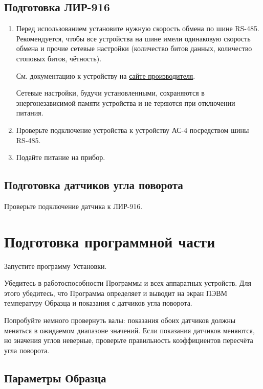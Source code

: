 \documentclass[12pt, a4paper, twocolumn]{report}
\begin{document}
\subsection{Подготовка ЛИР-916}

\begin{enumerate}

\item Перед использованием установите нужную скорость обмена по шине RS-485. Рекомендуется, чтобы все устройства на шине имели одинаковую скорость обмена и прочие сетевые настройки (количество битов данных, количество стоповых битов, чётность).

См. документацию к устройству на \href{http://www.skbis.ru/index.php?p=3&c=8&d=56}{сайте производителя}.

Сетевые настройки, будучи установленными, сохраняются в энергонезависимой памяти устройства и не теряются при отключении питания.

\item Проверьте подключение устройства к устройству АС-4 посредством шины RS-485.

\item Подайте питание на прибор.

\end{enumerate}

\subsection{Подготовка датчиков угла поворота}

Проверьте подключение датчика к ЛИР-916.

\section{Подготовка программной части}

Запустите программу Установки.

Убедитесь в работоспособности Программы и всех аппаратных устройств. Для этого убедитесь, что Программа определяет и выводит на экран ПЭВМ температуру Образца и показания с датчиков угла поворота.

Попробуйте немного провернуть валы: показания обоих датчиков должны меняться в ожидаемом диапазоне значений. Если показания датчиков меняются, но значения углов неверные, проверьте правильность коэффициентов пересчёта угла поворота.

\subsection{Параметры Образца}
\end{document}
